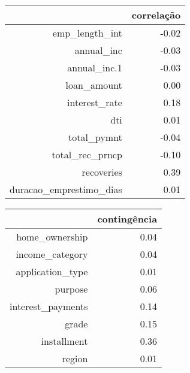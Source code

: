 \begin{figure}[H]
  \centering
  \vspace{.5cm}
  \vspace{.5cm}

  \label{fig:enter-label}
\end{figure}


\begin{table}[H]
  \centering
  \begin{tabular}{rr}
    \hline
   & correlação \\ 
    \hline
  emp\_length\_int & -0.02 \\ 
    annual\_inc & -0.03 \\ 
    annual\_inc.1 & -0.03 \\ 
    loan\_amount & 0.00 \\ 
    interest\_rate & 0.18 \\ 
    dti & 0.01 \\ 
    total\_pymnt & -0.04 \\ 
    total\_rec\_prncp & -0.10 \\ 
    recoveries & 0.39 \\ 
    duracao\_emprestimo\_dias & 0.01 \\ 
     \hline
  \end{tabular}
  \end{table}
  
  \begin{table}[H]
  \centering
  \begin{tabular}{rr}
    \hline
   & contingência \\ 
    \hline
  home\_ownership & 0.04 \\ 
    income\_category & 0.04 \\ 
    application\_type & 0.01 \\ 
    purpose & 0.06 \\ 
    interest\_payments & 0.14 \\ 
    grade & 0.15 \\ 
    installment & 0.36 \\ 
    region & 0.01 \\ 
     \hline
  \end{tabular}
\end{table}

